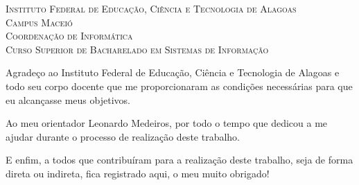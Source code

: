 \documentclass[
	12pt,				%
	openany,			%
	oneside,			%
	a4paper,			%
	english,			%
	french,				%
	spanish,			%
	brazil				%
	]{abntex2}
\begin{document}

\frenchspacing 



\begin{center}

\textsf{\textsc{Instituto Federal de Educação, Ciência e Tecnologia de Alagoas\\
 Campus Maceió\\
 Coordenação de Informática \\
 Curso Superior de Bacharelado em Sistemas de Informação 
}} 

\end{center}

\imprimircapa

\imprimirfolhaderosto*




%
% 
%




\begin{agradecimentos}

Agradeço ao Instituto Federal de Educação, Ciência e Tecnologia de Alagoas e todo seu corpo docente que me proporcionaram as condições necessárias para que eu alcançasse meus objetivos.

Ao meu orientador Leonardo Medeiros, por todo o tempo que dedicou a me ajudar durante o processo de realização deste trabalho.

E enfim, a todos que contribuíram para a realização deste trabalho, seja de forma direta ou indireta, fica registrado aqui, o meu muito obrigado!

\end{agradecimentos}
\end{document}
